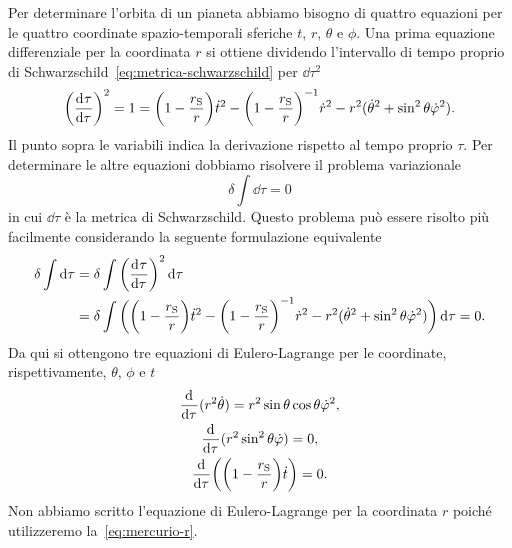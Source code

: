 Per determinare l'orbita di un pianeta abbiamo bisogno di quattro equazioni per
le quattro coordinate spazio-temporali sferiche $t$, $r$, $\theta$ e $\phi$.
Una prima equazione differenziale per la coordinata $r$ si ottiene dividendo
l'intervallo di tempo proprio di Schwarzschild~\eqref{eq:metrica-schwarzschild}
per $\dd\tau^{2}$
\begin{equation}
  \label{eq:mercurio-r}
  \bigg(\frac{{\mathop{}\!\mathrm{d}^{}}\tau}{\mathop{}\!\mathrm{d} {\tau}^{}}\bigg)^{2} = 1 = \bigg(1 -
  \frac{r_{\textup{S}}}{r}\bigg)\dot{t}^{2} - \bigg(1 -
  \frac{r_{\textup{S}}}{r}\bigg)^{-1}\dot{r}^{2} - r^{2}(\dot{\theta}^{2} +
  \sin^{2}\theta \dot{\varphi}^{2}).
\end{equation}
Il punto sopra le variabili indica la derivazione rispetto al tempo proprio
$\tau$.  Per determinare le altre equazioni dobbiamo risolvere il problema
variazionale
\begin{equation}
  \delta \int \dd \tau = 0
\end{equation}
in cui $\dd\tau$ è la metrica di Schwarzschild.  Questo problema può essere
risolto più facilmente considerando la seguente formulazione equivalente
\begin{equation}
  \begin{split}
    \delta\int \mathop{}\!\mathrm{d}\tau &= \delta \int \bigg(\frac{{\mathop{}\!\mathrm{d}^{}}\tau}{\mathop{}\!\mathrm{d} {\tau}^{}}\bigg)^{2} \mathop{}\!\mathrm{d}
    \tau \\
    &= \delta \int \bigg(\bigg(1 - \frac{r_{\textup{S}}}{r}\bigg)\dot{t}^{2} -
    \bigg(1 - \frac{r_{\textup{S}}}{r}\bigg)^{-1}\dot{r}^{2} -
    r^{2}(\dot{\theta}^{2} + \sin^{2}\theta \dot{\varphi}^{2}) \bigg) \mathop{}\!\mathrm{d} \tau = 0.
  \end{split}
\end{equation}
Da qui si ottengono tre equazioni di Eulero-Lagrange per le coordinate,
rispettivamente, $\theta$, $\phi$ e $t$
\begin{subequations}
  \begin{gather}
    \frac{{\mathop{}\!\mathrm{d}^{}}}{\mathop{}\!\mathrm{d} {\tau}^{}}(r^{2}\dot{\theta}) = r^{2}\sin\theta\cos\theta
    \dot{\varphi}^{2}, \label{eq:mercurio-mu} \\
    \frac{{\mathop{}\!\mathrm{d}^{}}}{\mathop{}\!\mathrm{d} {\tau}^{}}(r^{2} \sin^{2}\theta \dot{\varphi}) = 0, \label{eq:mercurio-phi}
    \\
    \frac{{\mathop{}\!\mathrm{d}^{}}}{\mathop{}\!\mathrm{d} {\tau}^{}}\bigg(\bigg(1 - \frac{r_{\textup{S}}}{r}\bigg) \dot{t} \bigg)
    = 0. \label{eq:mercurio-t}
  \end{gather}
\end{subequations}
Non abbiamo scritto l'equazione di Eulero-Lagrange per la coordinata $r$ poiché
utilizzeremo la~\eqref{eq:mercurio-r}.

